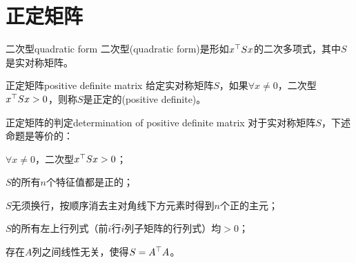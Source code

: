 \section{正定矩阵}

\begin{definition}{二次型}{quadratic form}
	二次型(quadratic form)是形如$x^\top Sx$的二次多项式，其中$S$是实对称矩阵。
\end{definition}
\begin{definition}{正定矩阵}{positive definite matrix}
	给定实对称矩阵$S$，如果$\forall x \neq 0$，二次型$x^\top Sx > 0$，则称$S$是正定的(positive definite)。
\end{definition}
\begin{theorem}{正定矩阵的判定}{determination of positive definite matrix}
	对于实对称矩阵$S$，下述命题是等价的：
	\begin{compactenum}
		\item $\forall x \neq 0$，二次型$x^\top Sx > 0$；
		\item $S$的所有$n$个特征值都是正的；
		\item $S$无须换行，按顺序消去主对角线下方元素时得到$n$个正的主元；
		\item $S$的所有左上行列式（前$i$行$i$列子矩阵的行列式）均$> 0$；
		\item 存在$A$列之间线性无关，使得$S = A^\top A$。
	\end{compactenum}
\end{theorem}
